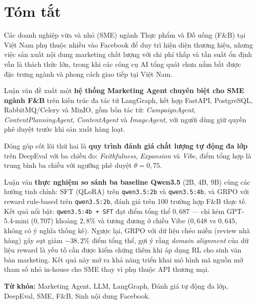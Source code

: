 \cleardoublepage
{}
{}
\chapter*{Tóm tắt}

Các doanh nghiệp vừa và nhỏ (SME) ngành Thực phẩm và Đồ uống (F\&B) tại Việt Nam phụ thuộc nhiều vào Facebook để duy trì hiện diện thương hiệu, nhưng việc sản xuất nội dung marketing chất lượng với chi phí thấp và tần suất ổn định vẫn là thách thức lớn, trong khi các công cụ AI tổng quát chưa nắm bắt được đặc trưng ngành và phong cách giao tiếp tại Việt Nam.

Luận văn đề xuất một \textbf{hệ thống Marketing Agent chuyên biệt cho SME ngành F\&B} trên kiến trúc đa tác tử LangGraph, kết hợp FastAPI, PostgreSQL, RabbitMQ/Celery và MinIO, gồm bốn tác tử: \textit{CampaignAgent}, \textit{ContentPlanningAgent}, \textit{ContentAgent} và \textit{ImageAgent}, với người dùng giữ quyền phê duyệt trước khi sản xuất hàng loạt.

Đóng góp cốt lõi thứ hai là \textbf{quy trình đánh giá chất lượng tự động đa lớp} trên DeepEval với ba chiều đo: \textit{Faithfulness}, \textit{Expansion} và \textit{Vibe}, điểm tổng hợp là trung bình ba chiều với ngưỡng phê duyệt $\theta = 0{,}75$.

Luận văn \textbf{thực nghiệm so sánh ba baseline Qwen3.5} (2B, 4B, 9B) cùng các hướng tinh chỉnh: SFT (QLoRA) trên \texttt{qwen3.5:2b} và \texttt{qwen3.5:4b}, và GRPO với reward rule-based trên \texttt{qwen3.5:2b}, đánh giá trên 100 trường hợp F\&B thực tế. Kết quả nổi bật: \texttt{qwen3.5:4b + SFT} đạt điểm tổng thể $0{,}687$ --- chỉ kém GPT-5.4-mini ($0{,}707$) khoảng $2{,}8\%$ và tương đương ở chiều Vibe ($0{,}648$ vs $0{,}645$, không có ý nghĩa thống kê). Ngược lại, GRPO với dữ liệu chéo miền (review nhà hàng) gây sụt giảm $-38{,}2\%$ điểm tổng thể, gợi ý rằng \emph{domain alignment} của dữ liệu reward là yếu tố cần được kiểm chứng thêm khi áp dụng RL cho sinh văn bản marketing. Kết quả này mở ra khả năng triển khai mô hình mã nguồn mở tham số nhỏ in-house cho SME thay vì phụ thuộc API thương mại.

\vspace{0.8em}

\noindent\textbf{Từ khóa:} Marketing Agent, LLM, LangGraph, Đánh giá tự động đa lớp, DeepEval, SME, F\&B, Sinh nội dung Facebook.
